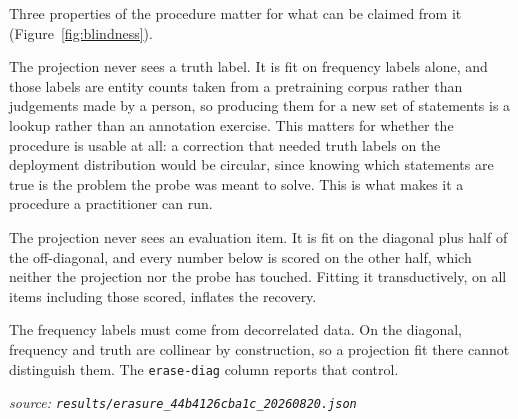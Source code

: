 \documentclass[10pt]{article}
\begin{document}
Three properties of the procedure matter for what can be claimed from it (Figure~\ref{fig:blindness}).

The projection never sees a truth label. It is fit on frequency labels alone, and those labels are entity counts taken from a pretraining corpus rather than judgements made by a person, so producing them for a new set of statements is a lookup rather than an annotation exercise. This matters for whether the procedure is usable at all: a correction that needed truth labels on the deployment distribution would be circular, since knowing which statements are true is the problem the probe was meant to solve. This is what makes it a procedure a practitioner can run.

The projection never sees an evaluation item. It is fit on the diagonal plus half of the off-diagonal, and every number below is scored on the other half, which neither the projection nor the probe has touched. Fitting it transductively, on all items including those scored, inflates the recovery.

The frequency labels must come from decorrelated data. On the diagonal, frequency and truth are collinear by construction, so a projection fit there cannot distinguish them. The \texttt{erase-diag} column reports that control.

{\footnotesize\raggedright\sloppy \emph{source: \texttt{results/erasure\_44b4126cba1c\_20260820.json}}\par}
\end{document}
